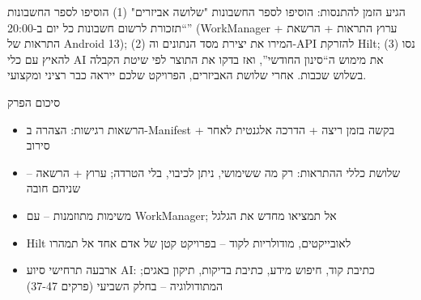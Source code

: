 \begin{tcbpractice}{הגיע הזמן להתנסות: הוסיפו לספר החשבונות "שלושה אביזרים"}
(1) הוסיפו לספר החשבונות “תזכורת לרשום חשבונות כל יום ב-20:00” (WorkManager + ערוץ התראות + הרשאת התראות של Android 13); (2) המירו את יצירת מסד הנתונים וה-API להזרקת Hilt; (3) נסו להאיץ עם כלי AI את מימוש ה“סינון החודשי”, ואז בדקו את התוצר לפי שיטת הקבלה בשלוש שכבות. אחרי שלושת האביזרים, הפרויקט שלכם ייראה כבר רציני ומקצועי.

\end{tcbpractice}

\begin{tcbsummary}{סיכום הפרק}
\begin{itemize}
  \item הרשאות רגישות: הצהרה ב-Manifest + בקשה בזמן ריצה + הדרכה אלגנטית לאחר סירוב
  \item שלושת כללי ההתראות: רק מה ששימושי, ניתן לכיבוי, בלי הטרדה; ערוץ + הרשאה – שניהם חובה
  \item משימות מתוזמנות – עם WorkManager; אל תמציאו מחדש את הגלגל
  \item ‏Hilt לאובייקטים, מודולריות לקוד – בפרויקט קטן של אדם אחד אל תמהרו
  \item ארבעה תרחישי סיוע AI: כתיבת קוד, חיפוש מידע, כתיבת בדיקות, תיקון באגים; המתודולוגיה – בחלק השביעי (פרקים 37-47)
\end{itemize}

\end{tcbsummary}
